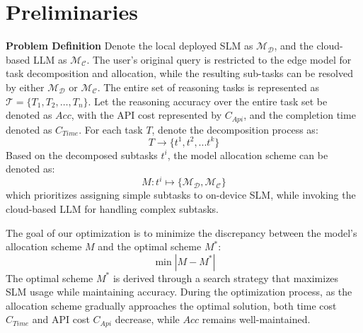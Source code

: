 \section{Preliminaries}

\textbf{Problem Definition}
Denote the local deployed SLM as $\mathcal{M}_\mathcal{D}$, and the cloud-based LLM as $\mathcal{M}_\mathcal{C}$.
The user's original query is restricted to the edge model for task decomposition and allocation, while the resulting sub-tasks can be resolved by either $\mathcal{M}_\mathcal{D}$ or $\mathcal{M}_\mathcal{C}$.
The entire set of reasoning tasks is represented as $\mathcal{T} = \{T_1, T_2, \dots, T_n\}$.
Let the reasoning accuracy over the entire task set be denoted as $Acc$, with the API cost represented by $C_{Api}$, and the completion time denoted as $C_{Time}$. 
For each task $T$, denote the decomposition process as:
\begin{equation}
T\rightarrow \{t^1,t^2,...t^{k}\}
\end{equation}
Based on the decomposed subtasks $t^i$, the model allocation scheme can be denoted as:
\begin{equation}
M :t^i\mapsto\{ \mathcal{M}_\mathcal{D} , \mathcal{M}_\mathcal{C}\}
\end{equation}
which prioritizes assigning simple subtasks to on-device SLM, while invoking the cloud-based LLM for handling complex subtasks.

The goal of our optimization is to minimize the discrepancy between the model's allocation scheme $M$ and the optimal scheme $M^*$:
\begin{equation}
   \min|M - M^*| 
\end{equation}
The optimal scheme $M^*$ is derived through a search strategy that maximizes SLM usage while maintaining accuracy. During the optimization process, as the allocation scheme gradually approaches the optimal solution, both time cost $C_{Time}$ and API cost $C_{Api}$ decrease, while $Acc$ remains well-maintained.

 